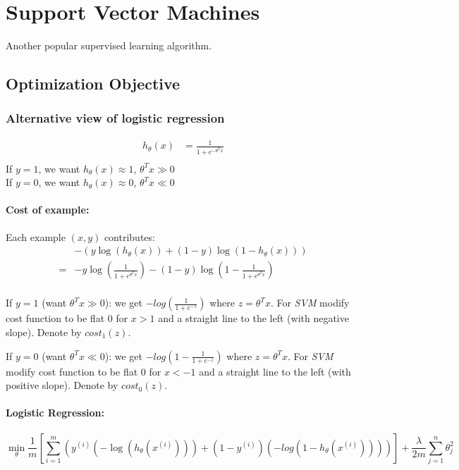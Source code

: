 \chapter{Support Vector Machines}
Another popular supervised learning algorithm.

\section{Optimization Objective}
\subsection{Alternative view of logistic regression}
\begin{align*}
	h_\theta(x) & = \frac{1}{1 + e^{-\theta^Tx}} \\
\end{align*}
If $y = 1$, we want $h_\theta(x) \approx 1$, $\theta^Tx \gg 0$\\
If $y = 0$, we want $h_\theta(x) \approx 0$, $\theta^Tx \ll 0$\\

\subsubsection{Cost of example:}
Each example $(x, y)$ contributes:
\begin{align*}
	  & -(y\log(h_\theta(x)) + (1-y)\log(1-h_\theta(x)))  \\
	= & -y\log\left(\frac{1}{1 + e^{\theta^Tx}}\right) -
	(1-y)\log\left(1 - \frac{1}{1 + e^{\theta^Tx}}\right) \\
\end{align*}

If $y = 1$ (want $\theta^Tx \gg 0$): we get $-log\left(\frac{1}{1 + e^{-z}}\right)$
where $z = \theta^Tx$.
For \emph{SVM} modify cost function to be flat $0$ for $x > 1$ and a straight
line to the left (with negative slope). Denote by ${cost}_1(z)$.

If $y = 0$ (want $\theta^Tx \ll 0$): we get $-log\left(1 - \frac{1}{1 + e^{-z}}\right)$
where $z = \theta^Tx$.
For \emph{SVM} modify cost function to be flat $0$ for $x < -1$ and a straight
line to the left (with positive slope). Denote by ${cost}_0(z)$.

\subsubsection{Logistic Regression:}
\begin{equation*}
	\min_\theta \frac{1}{m}\left[
		\sum_{i=1}^m \left(
		y^{(i)}\left(
		-\log\left(h_\theta(x^{(i)})\right)
		\right) + (1 - y^{(i)})\left(
		-log\left(1 - h_\theta(x^{(i)})\right)
		\right)
		\right)
		\right] + \frac{\lambda}{2m}\sum_{j=1}^n\theta_j^2
\end{equation*}

